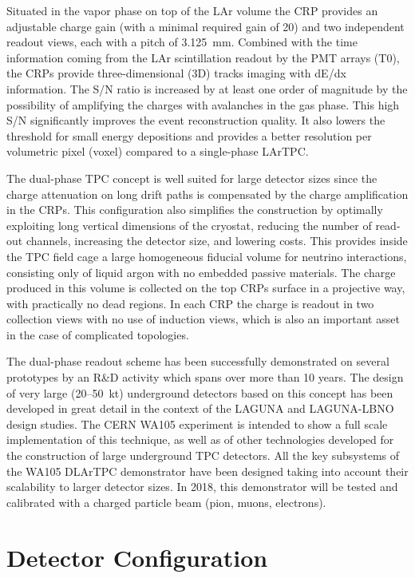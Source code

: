 Situated in the vapor phase on top of the LAr volume the CRP provides an adjustable charge gain (with a minimal required gain of 20) and two
independent readout views, each with a pitch of 3.125~mm.  Combined with the time information coming from the LAr scintillation readout by
the PMT arrays (T0), the CRPs provide three-dimensional (3D) tracks imaging with dE/dx information. The S/N ratio is increased by at least
one order of magnitude by the possibility of amplifying the charges with avalanches in the gas phase.  This high S/N significantly
improves the event reconstruction quality. It also lowers the threshold for small energy depositions and provides a better resolution per volumetric pixel (voxel) compared to a  single-phase LArTPC.

The dual-phase TPC concept is well suited for large detector sizes since the charge attenuation on long drift paths is compensated by the
charge amplification in the CRPs.  This configuration also simplifies the construction by optimally exploiting long vertical dimensions of
the cryostat, reducing the number of read-out channels, increasing the detector size, and lowering costs.  This provides inside the TPC field
cage a large homogeneous fiducial volume for neutrino interactions, consisting only of liquid argon with no embedded passive
materials. The charge produced in this volume is collected on the top CRPs surface in a projective way, with practically no dead regions. In
each CRP the charge is readout in two collection views with no use of induction views, which is also an important asset in the case of
complicated topologies.

The dual-phase readout scheme has been successfully demonstrated on several prototypes by an R\&D activity which spans over more than 10
years.  The design of very large (20--50~kt) underground detectors based on this concept has been developed in great detail in the context of the LAGUNA and LAGUNA-LBNO design studies.  The CERN WA105 experiment is intended to show a full scale implementation of this technique, as well as of other technologies developed for the construction of large underground TPC detectors.  All the key subsystems of the WA105 DLArTPC demonstrator have been designed taking into account their scalability to larger detector sizes.  In 2018, this demonstrator will be tested and calibrated with a charged particle beam (pion, muons, electrons).


\section{Detector Configuration}

